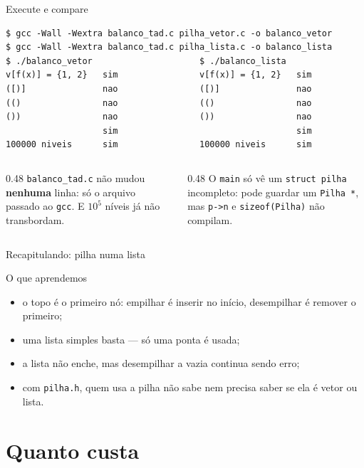 \documentclass[aspectratio=169]{beamer}
\begin{document}
\begin{frame}[fragile]{Execute e compare}
\begin{lstlisting}[style=shellStyle]
$ gcc -Wall -Wextra balanco_tad.c pilha_vetor.c -o balanco_vetor
$ gcc -Wall -Wextra balanco_tad.c pilha_lista.c -o balanco_lista
$ ./balanco_vetor                     $ ./balanco_lista
v[f(x)] = {1, 2}   sim                v[f(x)] = {1, 2}   sim
([)]               nao                ([)]               nao
(()                nao                (()                nao
())                nao                ())                nao
                   sim                                   sim
100000 niveis      sim                100000 niveis      sim
\end{lstlisting}
  \begin{columns}[T]
    \begin{column}{0.48\textwidth}
      \small \texttt{balanco\_tad.c} não mudou \textbf{nenhuma} linha: só
      o arquivo passado ao \texttt{gcc}. E $10^5$ níveis já não transbordam.
    \end{column}
    \begin{column}{0.48\textwidth}
      \small O \texttt{main} só vê um \texttt{struct pilha} incompleto: pode
      guardar um \texttt{Pilha *}, mas \texttt{p->n} e
      \texttt{sizeof(Pilha)} não compilam.
    \end{column}
  \end{columns}
\end{frame}

\begin{frame}{Recapitulando: pilha numa lista}
  \begin{block}{O que aprendemos}
    \begin{itemize}
      \item o topo é o primeiro nó: empilhar é inserir no início,
        desempilhar é remover o primeiro;
      \item uma lista simples basta --- só uma ponta é usada;
      \item a lista não enche, mas desempilhar a vazia continua sendo erro;
      \item com \texttt{pilha.h}, quem usa a pilha não sabe nem precisa
        saber se ela é vetor ou lista.
    \end{itemize}
  \end{block}
\end{frame}

\section{Quanto custa}
\end{document}
